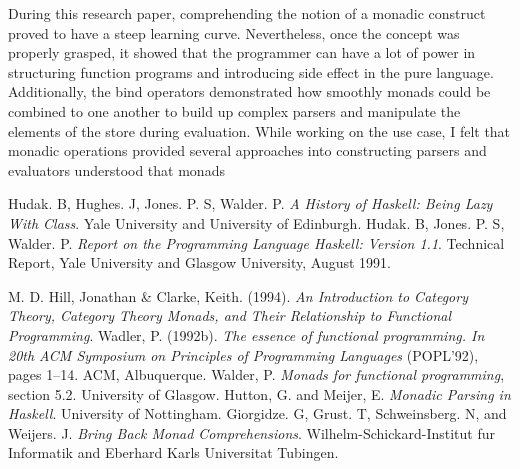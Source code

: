 \documentclass[a4paper, onecolumn]{article}
\begin{document}
    During this research paper, comprehending the notion of a monadic construct proved to have a steep learning curve. Nevertheless, once the concept was properly grasped, it showed that the programmer can have a lot of power in structuring function programs and introducing side effect in the pure language. Additionally, the bind operators demonstrated how smoothly monads could be combined to one another to build up complex parsers and manipulate the elements of the store during evaluation. While working on the use case, I felt that monadic operations provided several approaches into constructing parsers and evaluators   understood that monads 
    
    \begin{thebibliography}{9}
    Hudak. B, Hughes. J, Jones. P. S, Walder. P. \textit{A History of Haskell:
    Being Lazy With Class}. Yale University and University of Edinburgh.
    Hudak. B, Jones. P. S, Walder. P. \textit{Report on the Programming Language Haskell: Version 1.1}. Technical Report, Yale University and Glasgow University, August 1991.
    
    M. D. Hill, Jonathan & Clarke, Keith. (1994). \textit{An Introduction to Category Theory, Category Theory Monads, and Their Relationship to Functional Programming}.
    Wadler, P. (1992b). \textit{The essence of functional programming. In
    20th ACM Symposium on Principles of Programming Languages}
    (POPL’92), pages 1–14. ACM, Albuquerque.
    Walder, P. \textit{Monads for functional programming}, section 5.2. University of Glasgow. 
    Hutton, G. and Meijer, E. \textit{Monadic Parsing in Haskell}. University of Nottingham.
    Giorgidze. G, Grust. T, Schweinsberg. N, and Weijers. J. \textit{Bring Back Monad Comprehensions}. Wilhelm-Schickard-Institut fur Informatik and Eberhard Karls Universitat Tubingen.
    
    \end{thebibliography}
    
\end{document}
